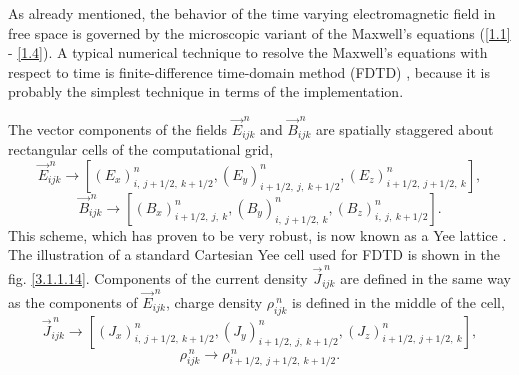 As already mentioned, the behavior of the time varying electromagnetic field in free space is governed by the microscopic variant of the Maxwell's equations (\ref{1.1} - \ref{1.4}). A typical numerical technique to resolve the Maxwell's equations with respect to time is finite-difference time-domain method (FDTD) \cite{yee}, because it is probably the simplest technique in terms of the implementation.

The vector components of the fields $ \vec{E}_{ijk}^{\,n} $ and $ \vec{B}_{ijk}^{\,n} $ are spatially staggered about rectangular cells of the computational grid,
\begin{equation}
\label{3.1.1.4}
\vec{E}_{ijk}^{\,n} \rightarrow \left[\left(E_{x}\right)^{n}_{i,\: j + 1/2,\: k + 1/2}, \left(E_{y}\right)^{n}_{i + 1/2,\: j,\: k + 1/2}, \left(E_{z}\right)^{n}_{i + 1/2,\: j + 1/2,\: k} \right],
\end{equation}
\begin{equation}
\label{3.1.1.5}
\vec{B}_{ijk}^{\,n} \rightarrow \left[\left(B_{x}\right)^{n}_{i + 1/2,\: j,\: k}, \left(B_{y}\right)^{n}_{i,\: j + 1/2,\: k}, \left(B_{z}\right)^{n}_{i,\: j,\: k + 1/2} \right].
\end{equation}
This scheme, which has proven to be very robust, is now known as a Yee lattice \cite{yee}. The illustration of a standard Cartesian Yee cell used for FDTD is shown in the fig. \ref{3.1.1.14}. Components of the current density $ \vec{J}_{ijk}^{\:n} $ are defined in the same way as the components of $ \vec{E}_{ijk}^{\:n} $, charge density $ \rho_{ijk}^{\:n} $ is defined in the middle of the cell,
\begin{equation}
\vec{J}_{ijk}^{\,n} \rightarrow \left[\left(J_{x}\right)^{n}_{i,\: j + 1/2,\: k + 1/2}, \left(J_{y}\right)^{n}_{i + 1/2,\: j,\: k + 1/2}, \left(J_{z}\right)^{n}_{i + 1/2,\: j + 1/2,\: k} \right],
\end{equation}
\begin{equation}
\rho_{ijk}^{\,n} \rightarrow \rho_{i + 1/2,\: j + 1/2,\: k + 1/2}^{\,n}.
\end{equation}

